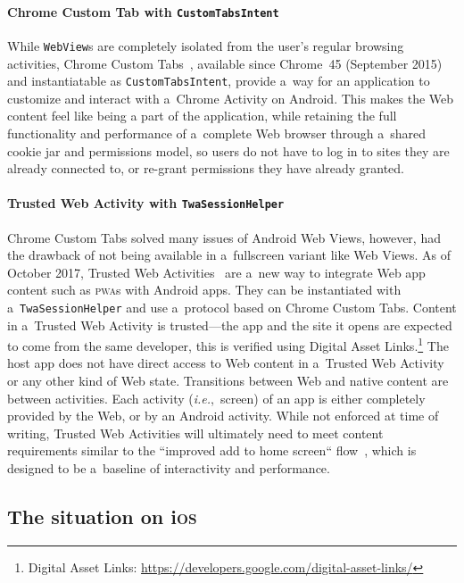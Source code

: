 \documentclass[sigconf]{acmart}
\begin{document}
\paragraph{Chrome Custom Tab with \texttt{CustomTabsIntent}}

While \texttt{WebView}s are completely isolated from the user's regular browsing activities,
Chrome Custom Tabs~\cite{kinlan2016customtabs}, available since Chrome~45 (September 2015)
and instantiatable as \texttt{CustomTabsIntent}, provide a~way for an application
to customize and interact with a~Chrome Activity on Android.
This makes the Web content feel like being a part of the application,
while retaining the full functionality and performance of a~complete Web browser
through a~shared cookie jar and permissions model, so users do not have to log in
to sites they are already connected to, or re-grant permissions they have already granted.

\paragraph{Trusted Web Activity with \texttt{TwaSessionHelper}}

Chrome Custom Tabs solved many issues of Android Web Views,
however, had the drawback of not being available in a~fullscreen variant like Web Views.
As of October 2017, Trusted Web Activities~\cite{googledevelopers2017twa} are a~new way to
integrate Web app content such as \textsc{pwa}s with Android apps.
They can be instantiated with a~\texttt{TwaSessionHelper}
and use a~protocol based on Chrome Custom Tabs.
Content in a~Trusted Web Activity is trusted---the app and the site it opens
are expected to come from the same developer, this is verified using Digital Asset
Links.\footnote{Digital Asset Links:
\url{https://developers.google.com/digital-asset-links/}}
The host app does not have direct access to Web content in a~Trusted Web Activity
or any other kind of Web state.
Transitions between Web and native content are between activities.
Each activity (\emph{i.e.},\ screen) of an app is either completely provided by the Web,
or by an Android activity.
While not enforced at time of writing, Trusted Web Activities
will ultimately need to meet content requirements
similar to the ``improved add to home screen`` flow~\cite{kinlan2017a2hs},
which is designed to be a~baseline of interactivity and performance.

\subsection{The situation on i\textsc{os}}
\end{document}
